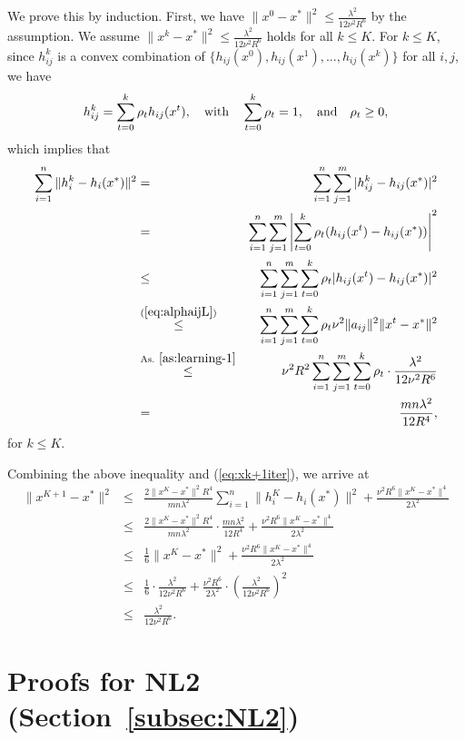 \documentclass[12pt]{article}
\newcommand{\newalpha}{h}
\begin{document}
We prove this by induction. First, we have $\|x^0 - x^*\|^2 \leq \frac{\lambda^2}{12\nu^2R^6}$ by the assumption. We assume $\|x^k - x^*\|^2 \leq \frac{\lambda^2}{12\nu^2R^6}$ holds for all $k \leq K$. For $k\leq K$, since $h_{ij}^k$ is a convex combination of $\{  \newalpha_{ij}(x^0), \newalpha_{ij}(x^1), ..., \newalpha_{ij}(x^k)  \}$ for all $i,j$, we have 
$$
h_{ij}^k = \sum_{t=0}^k \rho_t \newalpha_{ij}(x^t), \quad {\rm with}\quad  \sum_{t=0}^k\rho_t = 1, \quad {\rm and} \quad \rho_t \geq 0, 
$$
which implies that 
\begin{eqnarray*}
	\sum_{i=1}^n\|h_i^k - \newalpha_i(x^*)\|^2 &=& \sum_{i=1}^n \sum_{j=1}^m |h_{ij}^k - \newalpha_{ij}(x^*)|^2 \\
	&=&  \sum_{i=1}^n \sum_{j=1}^m \left|  \sum_{t=0}^k \rho_t (\newalpha_{ij}(x^t) - \newalpha_{ij}(x^*))  \right|^2 \\ 
	&\leq&  \sum_{i=1}^n \sum_{j=1}^m  \sum_{t=0}^k \rho_t | \newalpha_{ij}(x^t) - \newalpha_{ij}(x^*) |^2 \\ 
	&\overset{(\ref{eq:alphaijL})}{\leq}&  \sum_{i=1}^n \sum_{j=1}^m  \sum_{t=0}^k \rho_t \nu^2 \|a_{ij}\|^2 \|x^t - x^*\|^2 \\ 
	&\overset{\text{As.}~\ref{as:learning-1}}{\leq}& \nu^2 R^2 \sum_{i=1}^n \sum_{j=1}^m  \sum_{t=0}^k \rho_t \cdot \frac{\lambda^2}{12\nu^2R^6} \\
	&=& \frac{mn \lambda^2}{12R^4}, 
\end{eqnarray*}
for $k\leq K$. 

\noindent Combining the above inequality and (\ref{eq:xk+1iter}), we arrive at 
\begin{eqnarray*}
	\|x^{K+1} - x^*\|^2 &\leq& \frac{2\|x^K-x^*\|^2 R^4}{mn\lambda^2} \sum_{i=1}^n \|h_i^K - \newalpha_i(x^*)\|^2 + \frac{ \nu^2 R^6\|x^K-x^*\|^4}{2\lambda^2} \\
	&\leq&  \frac{2\|x^K-x^*\|^2 R^4}{mn\lambda^2} \cdot  \frac{mn \lambda^2}{12R^4} +  \frac{ \nu^2 R^6\|x^K-x^*\|^4}{2\lambda^2} \\
	&\leq& \frac{1}{6}\|x^K - x^*\|^2 +  \frac{ \nu^2 R^6\|x^K-x^*\|^4}{2\lambda^2} \\
	&\leq& \frac{1}{6} \cdot \frac{\lambda^2}{12\nu^2R^6} + \frac{ \nu^2 R^6}{2\lambda^2} \cdot \left(\frac{\lambda^2}{12\nu^2R^6} \right)^2 \\ 
	&\leq& \frac{\lambda^2}{12\nu^2R^6}. 
\end{eqnarray*}





\clearpage
\section{Proofs for {\sf NL2} (Section~\ref{subsec:NL2})}
 
\end{document}
